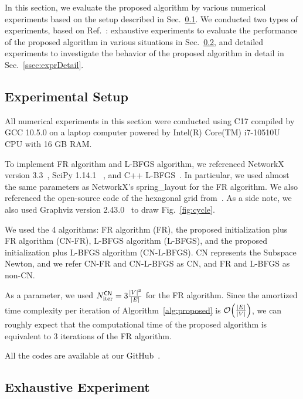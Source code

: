 \documentclass[dvipdfmx,10pt,journal,compsoc]{IEEEtran}
\newcommand{\Cpp}{C\nolinebreak[4]\hspace{-.05em}\raisebox{.4ex}{\relsize{-3}{\textbf{++}}}}
\begin{document}
In this section, we evaluate the proposed algorithm by various numerical experiments based on the setup described in Sec.~\ref{ssec:setup}.
We conducted two types of experiments, based on Ref.~\cite{8419285}:
exhaustive experiments to evaluate the performance of the proposed algorithm in various situations in Sec.~\ref{ssec:exprAll},
and detailed experiments to investigate the behavior of the proposed algorithm in detail in Sec.~\ref{ssec:exprDetail}.

\subsection{Experimental Setup}\label{ssec:setup}

All numerical experiments in this section were conducted using \Cpp17 compiled by GCC 10.5.0 on a laptop computer powered by Intel(R) Core(TM) i7-10510U CPU with 16 GB RAM.

To implement FR algorithm and L-BFGS algorithm, we referenced NetworkX version 3.3~\cite{hagberg2008exploring}, SciPy 1.14.1 ~\cite{2020SciPy-NMeth}, and C++ L-BFGS~\cite{qiuYixuanLBFGSpp2024,okazakiChokkanLiblbfgs2024}. In particular, we used almost the same parameters as NetworkX's \textsf{spring\_layout} for the FR algorithm.
We also referenced the open-source code of the hexagonal grid from~\cite{patelHexagonalGrids2013}.
As a side note, we also used Graphviz version 2.43.0~\cite{ellsonGraphvizOpenSource2002} to draw Fig.~\ref{fig:cycle}.

We used the 4 algorithms: FR algorithm (\textsf{FR}), the proposed initialization plus FR algorithm (\textsf{CN-FR}), L-BFGS algorithm (\textsf{L-BFGS}), and the proposed initialization plus L-BFGS algorithm (\textsf{CN-L-BFGS}). \textsf{CN} represents the Subspace Newton, and we refer \textsf{CN-FR} and \textsf{CN-L-BFGS} as \textsf{CN}, and \textsf{FR} and \textsf{L-BFGS} as non-\textsf{CN}.

As a parameter, we used $N_\mathrm{iter}^\mathsf{CN} = 3 \frac{\abs{V}^3}{\abs{E}}$ for the FR algorithm. Since the amortized time complexity per iteration of
Algorithm~\ref{alg:proposed} is $\order{\frac{\abs{E}}{\abs{V}}}$, we can roughly expect that the computational time of the proposed algorithm is equivalent to 3 iterations of the FR algorithm.

All the codes are available at our GitHub~\cite{ThisPaperGitHub}.

\subsection{Exhaustive Experiment}\label{ssec:exprAll}
\end{document}
